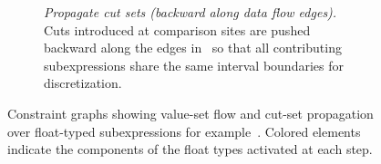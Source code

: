 \begin{figure}[t]
\begin{subfigure}[t]{\textwidth}
\begin{minipage}[c]{\textwidth}
{
    }
    \end{minipage}\hfill
    \caption{\emph{Propagate cut sets (backward along data flow edges).} Cuts introduced at comparison sites are pushed backward along the edges in~ so that all contributing subexpressions share the same interval boundaries for discretization.}
    \label{fig:control-flow-gaussian-d}
    \end{subfigure}

    \caption{Constraint graphs showing value-set flow and cut-set propagation over float-typed subexpressions for example~. Colored elements indicate the components of the float types activated at each step.}
    \label{fig:control-flow-gaussian}
\end{figure}
